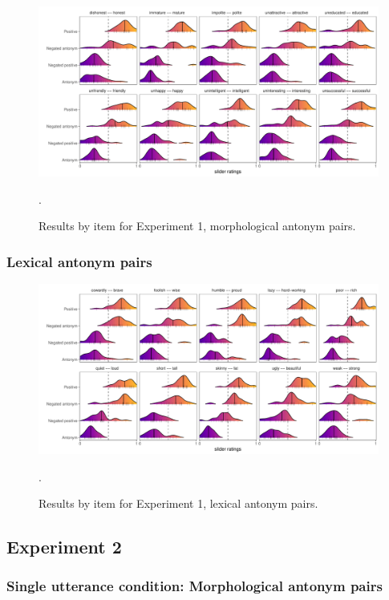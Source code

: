 \documentclass[floatsintext,doc]{apa6}
\begin{document}
\begin{figure}[t]
\centering \includegraphics{figs/cogsci_expt1_morph_byItem_densities.pdf} 
\caption{Results by item for Experiment 1, morphological antonym pairs.}.\label{fig:items_morph_expt1}
\end{figure}


\subsubsection{Lexical antonym pairs}

\begin{figure}[t]
\centering \includegraphics{figs/cogsci_expt1_lex_byItem_densities.pdf} 
\caption{Results by item for Experiment 1, lexical antonym pairs.}.\label{fig:items_lex_expt1}

\end{figure}




\subsection{Experiment 2}

\subsubsection{Single utterance condition: Morphological antonym pairs}
\end{document}
